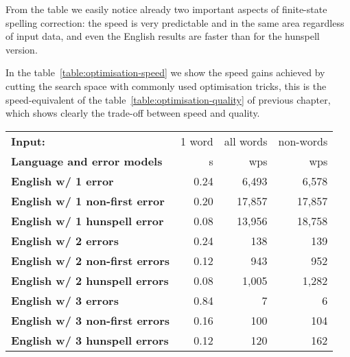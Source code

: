 \documentclass[a4paper,12pt]{article}
\begin{document}
From the table we easily notice already two important aspects of finite-state
spelling correction: the speed is very predictable and in the same area
regardless of input data, and even the English results are faster than for the
hunspell version. 

In the table~\ref{table:optimisation-speed} we show the speed gains achieved by
cutting the search space with commonly used optimisation tricks, this is the
speed-equivalent of the table~\ref{table:optimisation-quality} of previous
chapter, which shows clearly the trade-off between speed and quality.

\begin{table}
    \centering
    \begin{tabular}{|l|r|r|r|}
        \hline
        \bf Input:                    & 1 word & all words & non-words \\
        \bf Language and error models & s      & wps       & wps       \\
        \hline
        \bf English w/ 1 error     & 0.24  & 6,493  & 6,578 \\
 \bf English w/ 1 non-first error  & 0.20  & 17,857 & 17,857  \\
 \bf English w/ 1 hunspell error   & 0.08  & 13,956 & 18,758  \\
     \bf English w/ 2 errors       & 0.24  & 138    & 139  \\
 \bf English w/ 2 non-first errors & 0.12  & 943    & 952 \\
 \bf English w/ 2 hunspell errors  & 0.08  & 1,005  & 1,282 \\
   \bf English w/ 3 errors         & 0.84  & 7      & 6    \\
 \bf English w/ 3 non-first errors & 0.16  & 100    & 104  \\
 \bf English w/ 3 hunspell errors  & 0.12  & 120    & 162  \\
        \hline

\end{tabular}
\end{table}
\end{document}
